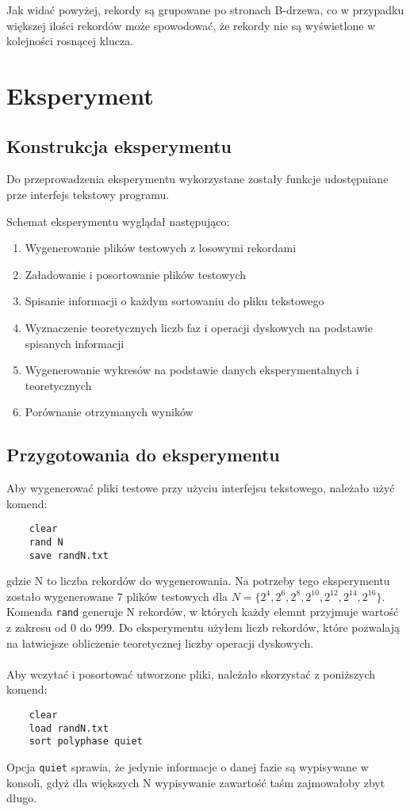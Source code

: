 \documentclass[12pt]{article}
\begin{document}
Jak widać powyżej, rekordy są grupowane po stronach B-drzewa, co w przypadku większej ilości rekordów może spowodować,
że rekordy nie są wyświetlone w kolejności rosnącej klucza.

\section{Eksperyment}
\subsection{Konstrukcja eksperymentu}
Do przeprowadzenia eksperymentu wykorzystane zostały funkcje udostępniane prze interfejs
tekstowy programu.

Schemat eksperymentu wyglądał następująco:

\begin{enumerate}
    \item Wygenerowanie plików testowych z losowymi rekordami
    \item Załadowanie i posortowanie plików testowych
    \item Spisanie informacji o każdym sortowaniu do pliku tekstowego
    \item Wyznaczenie teoretycznych liczb faz i operacji dyskowych na podstawie spisanych informacji
    \item Wygenerowanie wykresów na podstawie danych eksperymentalnych i teoretycznych
    \item Porównanie otrzymanych wyników
\end{enumerate}

\subsection{Przygotowania do eksperymentu}
Aby wygenerować pliki testowe przy użyciu interfejsu tekstowego, należało użyć komend: 
\begin{verbatim}
    clear
    rand N
    save randN.txt
\end{verbatim}
gdzie N to liczba rekordów do wygenerowania. Na potrzeby tego eksperymentu zostało
wygenerowane 7 plików testowych dla \(N = \{2^4, 2^6, 2^8, 2^{10}, 2^{12}, 2^{14}, 2^{16}\}\).
Komenda \verb|rand| generuje N rekordów, w których każdy elemnt przyjmuje wartość z zakresu od 0 do 999. 
Do eksperymentu użyłem liczb rekordów, które pozwalają na łatwiejsze obliczenie teoretycznej liczby
operacji dyskowych.
\\ \\
Aby wczytać i posortować utworzone pliki, należało skorzystać z poniższych komend:
\begin{verbatim}
    clear
    load randN.txt
    sort polyphase quiet
\end{verbatim}
Opcja \verb|quiet| sprawia, że jedynie informacje o danej fazie są wypisywane w konsoli, gdyż
dla większych N wypisywanie zawartość taśm zajmowałoby zbyt długo.
\end{document}
